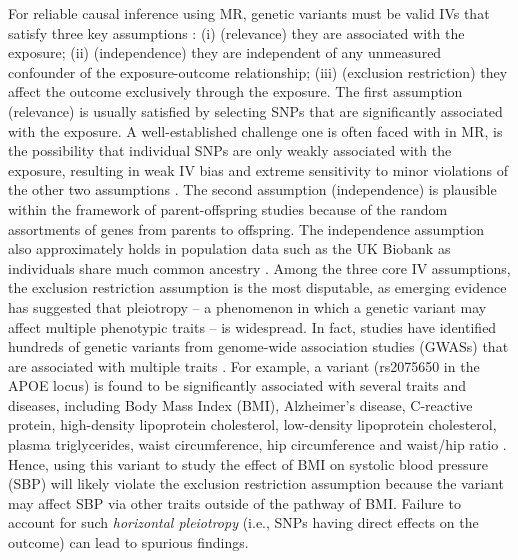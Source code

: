 \documentclass[12pt]{article}
\begin{document}
For reliable causal inference using MR, genetic variants must be valid IVs that satisfy  three key assumptions \citep{Angrist2001, Baiocchi:2014aa, Hernan-Robins}: (i) (relevance) they are associated with the exposure; (ii) (independence) they are independent of any unmeasured confounder of the exposure-outcome relationship; (iii) (exclusion restriction) they affect the outcome exclusively through the exposure. The first assumption (relevance) is usually satisfied by selecting SNPs that are significantly associated with the exposure. A well-established challenge one is often faced with in MR, is the possibility that individual SNPs are only weakly associated with the exposure, resulting in weak IV bias \citep{Stock:2002aa, Burgess:2011aa, Burgess:2011ab} and extreme sensitivity to minor violations of the other two assumptions  \citep{Small:2008aa,  Wang:2018aa}. The second assumption (independence) is plausible within the framework of parent-offspring studies because of the random assortments of  genes from parents to offspring. The independence assumption also approximately holds in population data such as the UK Biobank as individuals share much common ancestry \citep{smith2020mendel}.   Among the three core IV assumptions, the exclusion restriction assumption is the most disputable, as emerging evidence has suggested that pleiotropy -- a phenomenon in which a genetic variant may affect multiple phenotypic traits  \citep{ Solovieff:2013aa, Verbanck:2018aa} -- is widespread. In fact, studies have identified hundreds of genetic variants from genome-wide association studies (GWASs) that are associated with multiple traits \citep{Sivakumaran:2011aa,  Parkes:2013aa, Gratten:2016aa, Pickrell:2016aa, Grassmann:2017aa, Webb:2017aa}. For example, a variant (rs2075650 in the APOE locus) is found to be significantly associated with several traits and diseases, including Body Mass Index (BMI), Alzheimer's disease, C-reactive protein,  high-density lipoprotein cholesterol, low-density lipoprotein cholesterol, plasma triglycerides, waist circumference, hip circumference and waist/hip ratio  \citep{Verbanck:2018aa}. Hence, using this variant to study the effect of BMI on systolic blood pressure (SBP) will likely violate the exclusion restriction assumption because the variant may affect SBP via other traits outside of the pathway of BMI. Failure to account for such \emph{horizontal pleiotropy} (i.e., SNPs having direct effects on the outcome) can lead to spurious findings. 


\vspace{-3mm}
\end{document}
